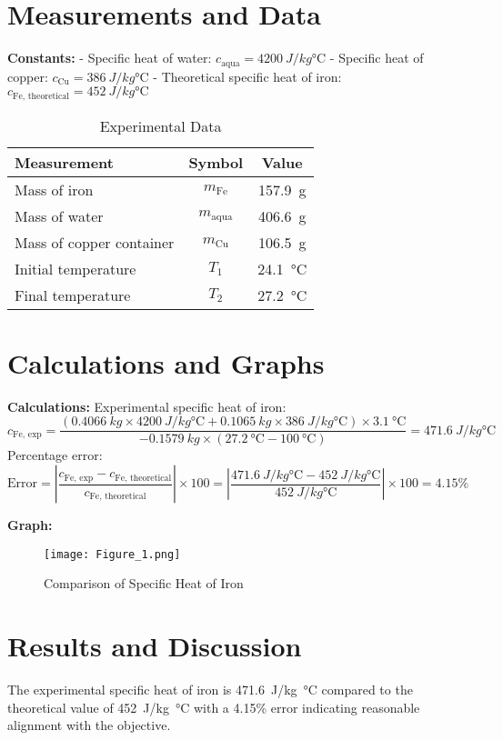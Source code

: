 \documentclass[12pt, a4paper]{article}
\begin{document}
\section{Measurements and Data}
\textbf{Constants:}  
- Specific heat of water: $c_{\text{aqua}} = \SI{4200}{J/kg\celsius}$  
- Specific heat of copper: $c_{\text{Cu}} = \SI{386}{J/kg\celsius}$  
- Theoretical specific heat of iron: $c_{\text{Fe, theoretical}} = \SI{452}{J/kg\celsius}$

\begin{table}[h]
\centering
\begin{tabular}{|l|c|c|}
\hline
\textbf{Measurement} & \textbf{Symbol} & \textbf{Value} \\
\hline
Mass of iron & $m_{\text{Fe}}$ & \SI{157.9}{g} \\
Mass of water & $m_{\text{aqua}}$ & \SI{406.6}{g} \\
Mass of copper container & $m_{\text{Cu}}$ & \SI{106.5}{g} \\
Initial temperature & $T_1$ & \SI{24.1}{\celsius} \\
Final temperature & $T_2$ & \SI{27.2}{\celsius} \\
\hline
\end{tabular}
\caption{Experimental Data}
\label{tab:measurements}
\end{table}

\section{Calculations and Graphs}
\textbf{Calculations:}  
Experimental specific heat of iron:  
  \[
  c_{\text{Fe, exp}} = \frac{(\SI{0.4066}{kg} \times \SI{4200}{J/kg\celsius} + \SI{0.1065}{kg} \times \SI{386}{J/kg\celsius}) \times \SI{3.1}{\celsius}}{-\SI{0.1579}{kg} \times (\SI{27.2}{\celsius} - \SI{100}{\celsius})} = \SI{471.6}{J/kg\celsius}
  \]
Percentage error:  
  \[
  \text{Error} = \left| \frac{c_{\text{Fe, exp}} - c_{\text{Fe, theoretical}}}{c_{\text{Fe, theoretical}}} \right| \times 100 = \left| \frac{\SI{471.6}{J/kg\celsius} - \SI{452}{J/kg\celsius}}{\SI{452}{J/kg\celsius}} \right| \times 100 = 4.15\%
  \]

\textbf{Graph:}  
\begin{figure}[H]
	\centering
	\texttt{[image: Figure\_1.png]}
	\caption{Comparison of Specific Heat of Iron}
	\label{fig:comparison}
\end{figure}

\section{Results and Discussion}
The experimental specific heat of iron is \SI{471.6}{J/kg\celsius} compared to the theoretical value of \SI{452}{J/kg\celsius} with a 4.15\% error indicating reasonable alignment with the objective.
\end{document}
